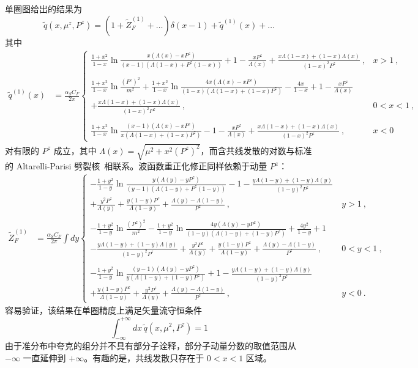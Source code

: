单圈图给出的结果为
\begin{equation}
                    \tilde q(x, \mu^z, P^z) = (1+\tilde Z^{(1)}_F+\dots) \delta(x-1) + \tilde q^{(1)}(x) + \dots
\end{equation}
其中
\begin{align}\label{unpolvertexnoexp}
\tilde q^{(1)}(x)&=\frac{\alpha_S C_F}{2\pi} \left\{ \begin{array} {ll} \frac{1+x^2}{1-x}\ln \frac{x(\Lambda(x)-x P^z)}{(x-1)(\Lambda(1-x)+P^z(1-x))}+1-\frac{x P^z}{\Lambda(x)}+\frac{x\Lambda(1-x)+(1-x)\Lambda(x)}{(1-x)^2 P^z}\ , & x>1\ , \\
\ \\
\frac{1+x^2}{1-x}\ln\frac{(P^z)^2}{m^2}+\frac{1+x^2}{1-x}\ln \frac{4x(\Lambda(x)-x P^z)}{(1-x)(\Lambda(1-x)+(1-x)P^z)}-\frac{4x}{1-x}+1-\frac{x P^z}{\Lambda(x)}\ & \\
+\frac{x\Lambda(1-x)+(1-x)\Lambda(x)}{(1-x)^2 P^z}\ , & 0<x<1\ , \\
\ \\
\frac{1+x^2}{1-x}\ln \frac{(x-1)(\Lambda(x)-x P^z)}{x(\Lambda(1-x)+(1-x)P^z)}-1-\frac{x P^z}{\Lambda(x)}+\frac{x\Lambda(1-x)+(1-x)\Lambda(x)}{(1-x)^2P^z}\ , & x<0 \end{array} \right.
\end{align}
对有限的 $P^z$ 成立，其中 $\Lambda(x)=\sqrt{\mu^2+x^2 (P^z)^2}$，而含共线发散的对数与标准的 Altarelli-Parisi 劈裂核~\cite{AP}相联系。波函数重正化修正同样依赖于动量 $P^z$：
\begin{align}\label{selfnoexp}
\tilde Z^{(1)}_F&=\frac{\alpha_S C_F}{2\pi} \int dy \left\{ \begin{array} {ll} -\frac{1+y^2}{1-y}\ln \frac{y(\Lambda(y)-y P^z)}{(y-1)(\Lambda(1-y)+P^z(1-y))}-1-\frac{y\Lambda(1-y)+(1-y)\Lambda(y)}{(1-y)^2 P^z}\ & \\
+\frac{y^2 P^z}{\Lambda(y)}+\frac{y(1-y)P^z}{\Lambda(1-y)}+\frac{\Lambda(y)-\Lambda(1-y)}{P^z}\ , & y>1\ , \\
\ \\
-\frac{1+y^2}{1-y}\ln\frac{(P^z)^2}{m^2}-\frac{1+y^2}{1-y}\ln \frac{4y(\Lambda(y)-y P^z)}{(1-y)(\Lambda(1-y)+(1-y)P^z)}+\frac{4y^2}{1-y}+1\ & \\
-\frac{y\Lambda(1-y)+(1-y)\Lambda(y)}{(1-y)^2P^z}+\frac{y^2 P^z}{\Lambda(y)}+\frac{y(1-y)P^z}{\Lambda(1-y)}+\frac{\Lambda(y)-\Lambda(1-y)}{P^z}\ , & 0<y<1\ , \\
\ \\
-\frac{1+y^2}{1-y}\ln \frac{(y-1)(\Lambda(y)-y P^z)}{y(\Lambda(1-y)+(1-y)P^z)}+1-\frac{y\Lambda(1-y)+(1-y)\Lambda(y)}{(1-y)^2P^z}\ & \\
+\frac{y(1-y)P^z}{\Lambda(1-y)}+\frac{y^2 P^z}{\Lambda(y)}+\frac{\Lambda(y)-\Lambda(1-y)}{P^z}\ , & y<0\ . \end{array} \right.
\end{align}
容易验证，该结果在单圈精度上满足矢量流守恒条件
\begin{equation}
  \int^{+\infty}_{-\infty} dx\, \tilde q(x, \mu^2, P^z) =1
\end{equation}
由于准分布中夸克的组分并不具有部分子诠释，部分子动量分数的取值范围从 $-\infty$ 一直延伸到 $+\infty$。有趣的是，共线发散只存在于 $0<x<1$ 区域。


